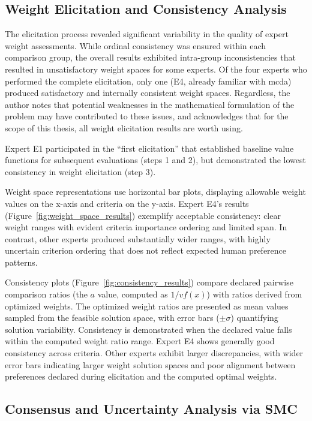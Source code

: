 \subsection{Weight Elicitation and Consistency Analysis}
\label{subsec:weight_consistency}

The elicitation process revealed significant variability in the quality of expert weight assessments. While ordinal consistency was ensured within each comparison group, the overall results exhibited intra-group inconsistencies that resulted in unsatisfactory weight spaces for some experts. Of the four experts who performed the complete elicitation, only one (E4, already familiar with \gls{mcda}) produced satisfactory and internally consistent weight spaces. Regardless, the author notes that potential weaknesses in the mathematical formulation of the problem may have contributed to these issues, and acknowledges that for the scope of this thesis, all weight elicitation results are worth using.

Expert E1 participated in the “first elicitation” that established baseline value functions for subsequent evaluations (steps 1 and 2), but demonstrated the lowest consistency in weight elicitation (step 3). 

Weight space representations use horizontal bar plots, displaying allowable weight values on the x-axis and criteria on the y-axis. Expert E4's results (Figure~\ref{fig:weight_space_results}) exemplify acceptable consistency: clear weight ranges with evident criteria importance ordering and limited span. In contrast, other experts produced substantially wider ranges, with highly uncertain criterion ordering that does not reflect expected human preference patterns.

Consistency plots (Figure~\ref{fig:consistency_results}) compare declared pairwise comparison ratios (the $a$ value, computed as $1/vf(x)$) with ratios derived from optimized weights. The optimized weight ratios are presented as mean values sampled from the feasible solution space, with error bars ($\pm \sigma$) quantifying solution variability. Consistency is demonstrated when the declared value falls within the computed weight ratio range. Expert E4 shows generally good consistency across criteria. Other experts exhibit larger discrepancies, with wider error bars indicating larger weight solution spaces and poor alignment between preferences declared during elicitation and the computed optimal weights.

\subsection{Consensus and Uncertainty Analysis via SMC}
\label{subsec:consensus_analysis}

